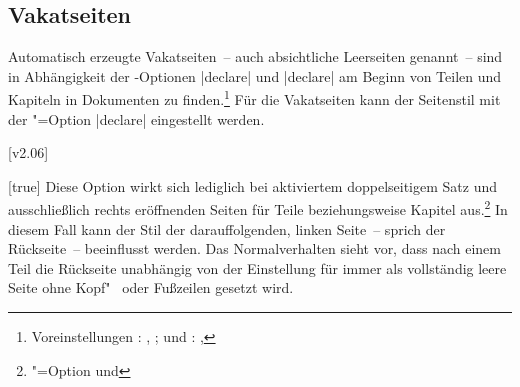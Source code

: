 \begin{Declaration*}{}
\begin{Declaration*}{}
\begin{Declaration*}{}
\subsection{Vakatseiten}
%
%
Automatisch erzeugte Vakatseiten~-- auch absichtliche Leerseiten genannt~-- 
sind in Abhängigkeit der \KOMAScript-Optionen |declare| 
und |declare| am Beginn von Teilen und Kapiteln in 
Dokumenten zu finden.\footnote{%
  Voreinstellungen : , 
  ;  und : 
  , 
} Für die Vakatseiten kann der Seitenstil mit der \KOMAScript"=Option 
|declare| eingestellt werden.

[v2.06]
\begin{Declaration}{}[true]%
\printdeclarationlist%
%
%
%
%
%
Diese Option wirkt sich lediglich bei aktiviertem doppelseitigem Satz und 
ausschließlich rechts eröffnenden Seiten für Teile beziehungsweise Kapitel
aus.\footnote{%
  \KOMAScript"=Option  und %
} 
In diesem Fall kann der Stil der darauffolgenden, linken Seite~-- sprich der 
Rückseite~-- beeinflusst werden. Das Normalverhalten sieht vor, dass nach einem 
Teil die Rückseite unabhängig von der Einstellung für  
immer als vollständig leere Seite ohne Kopf"~ oder Fußzeilen gesetzt wird.


\end{Declaration}
\end{Declaration*}
\end{Declaration*}
\end{Declaration*}
